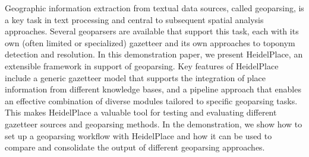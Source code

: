 Geographic information extraction from textual data sources, called geoparsing, is a key task in text processing and central to subsequent spatial analysis approaches. Several geoparsers are available that support this task, each with its own (often limited or specialized) gazetteer and its own approaches to toponym detection and resolution. In this demonstration paper, we present HeidelPlace, an extensible framework in support of geoparsing. Key features of HeidelPlace include a generic gazetteer model that supports the integration of place information from different knowledge bases, and a pipeline approach that enables an effective combination of diverse modules tailored to specific geoparsing tasks. This makes HeidelPlace a valuable tool for testing and evaluating different gazetteer sources and geoparsing methods. In the demonstration, we show how to set up a geoparsing workflow with HeidelPlace and how it can be used to compare and consolidate the output of different geoparsing approaches.
